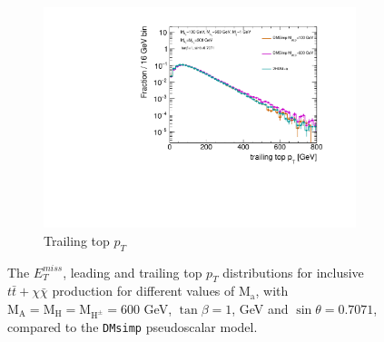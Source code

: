 \begin{figure}
\begin{subfigure}[b]{0.45\textwidth}
    \includegraphics[width=\textwidth]{texinputs/04_grid/figures/DMHF/benchmarking/MDM_1_Ma_100_MA_600_sinp_0.7071_tanb_1.0_VS_DMSimp_100_600_Decayed/top2ptlog.pdf}
    \caption{Trailing top $p_{T}$}
  \end{subfigure}
  \caption{The $E_{T}^{miss}$, leading and trailing top $p_{T}$ distributions for inclusive $t\bar{t}+\chi\bar{\chi}$ production for different values of $\mathrm{M_a}$, with $\mathrm{M_A}=\mathrm{M_H}=\mathrm{M_{H^{\pm}}}=600$ GeV, $\tan\beta=1$,  GeV and $\sin\theta=0.7071$, compared to the \texttt{DMsimp} pseudoscalar model.}
  \label{fig:kin_DMSimpV2HDMa}
\end{figure}


